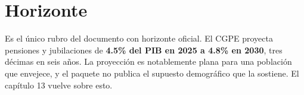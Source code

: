 \section{Horizonte}

Es el único rubro del documento con horizonte oficial. El CGPE proyecta pensiones
y jubilaciones de \textbf{4.5\% del PIB en 2025 a 4.8\% en 2030}, tres décimas en
seis años. La proyección es notablemente plana para una población que envejece, y
el paquete no publica el supuesto demográfico que la sostiene. El capítulo 13
vuelve sobre esto.

\clearpage
